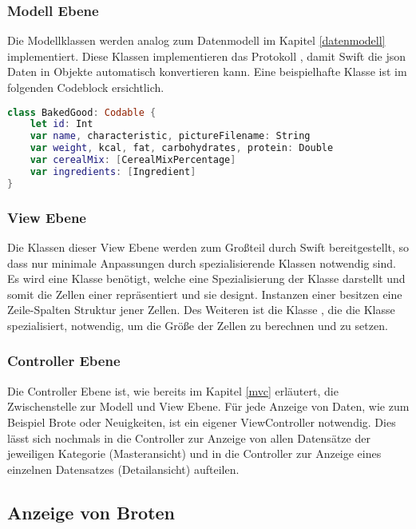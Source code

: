 \subsubsection{Modell Ebene}
Die Modellklassen werden analog zum Datenmodell im Kapitel \ref{datenmodell} implementiert.
Diese Klassen implementieren das Protokoll  , damit Swift die \gls{json} Daten in Objekte automatisch konvertieren kann. Eine beispielhafte Klasse ist im folgenden Codeblock ersichtlich.
\begin{lstlisting}[language=Swift]
class BakedGood: Codable {
    let id: Int
    var name, characteristic, pictureFilename: String
    var weight, kcal, fat, carbohydrates, protein: Double
    var cerealMix: [CerealMixPercentage]
    var ingredients: [Ingredient]
}
\end{lstlisting}

\clearpage

\subsubsection{View Ebene}
Die Klassen dieser View Ebene werden zum Großteil durch Swift bereitgestellt, so dass nur minimale Anpassungen durch spezialisierende Klassen notwendig sind.
Es wird eine Klasse  benötigt, welche eine Spezialisierung der Klasse  darstellt und somit die Zellen einer  repräsentiert und sie designt. Instanzen einer  besitzen eine Zeile-Spalten Struktur jener Zellen.
Des Weiteren ist die Klasse  , die die Klasse  spezialisiert, notwendig, um die Größe der Zellen zu berechnen und zu setzen.

\subsubsection{Controller Ebene}
Die Controller Ebene ist, wie bereits im Kapitel \ref{mvc} erläutert, die Zwischenstelle zur Modell und View Ebene.
Für jede Anzeige von Daten, wie zum Beispiel Brote oder Neuigkeiten, ist ein eigener ViewController notwendig.
Dies lässt sich nochmals in die Controller zur Anzeige von allen Datensätze der jeweiligen Kategorie (Masteransicht) und in die Controller zur Anzeige eines einzelnen Datensatzes (Detailansicht) aufteilen.

\clearpage

\subsection{Anzeige von Broten}

